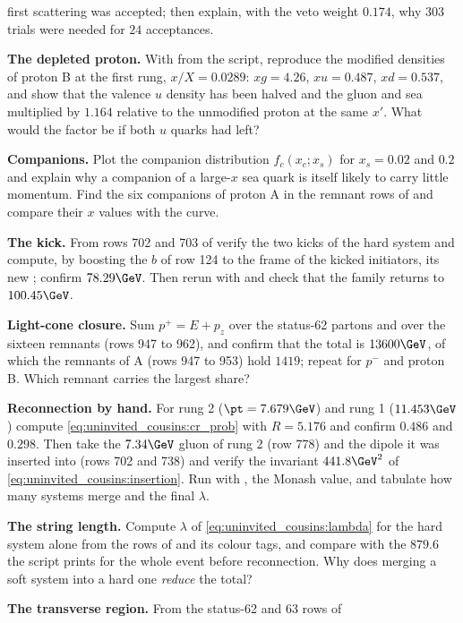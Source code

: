 \begin{exercises}
  first scattering was accepted; then explain, with the veto weight
  $0.174$, why $303$ trials were needed for $24$ acceptances.
\item \textbf{The depleted proton.} With  from the script,
  reproduce the modified densities of proton B at the first rung,
  $x/X=0.0289$: $xg=4.26$, $xu=0.487$, $xd=0.537$, and show that the valence
  $u$ density has been halved and the gluon and sea multiplied by $1.164$
  relative to the unmodified proton at the same $x'$. What would the
  factor be if both $u$ quarks had left?
\item \textbf{Companions.} Plot the companion distribution
  $f_c(x_c;x_s)$ for $x_s=0.02$ and $0.2$ and explain why a companion of a
  large-$x$ sea quark is itself likely to carry little momentum. Find the
  six companions of proton A in the remnant rows of  and
  compare their $x$ values with the curve.
\item \textbf{The kick.} From rows 702 and 703 of 
  verify the two kicks of the hard system and compute, by boosting the
  $b$ of row 124 to the frame of the kicked initiators, its new \pt;
  confirm $78.29\GeV$. Then rerun with  and check that the
  family \pt returns to $100.45\GeV$.
\item \textbf{Light-cone closure.} Sum $p^+=E+p_z$ over the status-62
  partons and over the sixteen remnants (rows 947 to 962), and confirm that
  the total is $13600\GeV$, of which the remnants of A (rows 947 to 953)
  hold $1419$; repeat for $p^-$ and proton B. Which remnant carries the
  largest share?
\item \textbf{Reconnection by hand.} For rung 2 ($\pt=7.679\GeV$) and rung 1
  ($11.453\GeV$) compute \cref{eq:uninvited_cousins:cr_prob} with
  $R=5.176$ and confirm $0.486$ and $0.298$. Then take the $7.34\GeV$ gluon
  of rung 2 (row 778) and the dipole it was inserted into (rows 702 and
  738) and verify the invariant $441.8\GeV^2$ of
  \cref{eq:uninvited_cousins:insertion}. Run with ,
  the Monash value, and tabulate how many systems merge and the final
  $\lambda$.
\item \textbf{The string length.} Compute $\lambda$ of
  \cref{eq:uninvited_cousins:lambda} for the hard system alone from the
  rows of  and its colour tags, and compare with the
  $879.6$ the script prints for the whole event before reconnection. Why does
  merging a soft system into a hard one \emph{reduce} the total?
\item \textbf{The transverse region.} From the status-62 and 63 rows of

\end{exercises}
